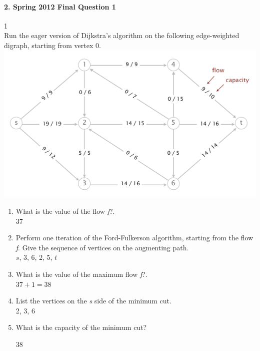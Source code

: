 \documentclass{article}
\begin{document}
\paragraph{\Large 2. Spring 2012 Final Question 1}1\mbox{}\\
Run the eager version of Dijkstra’s algorithm on the following edge-weighted digraph, starting from vertex 0.\\
\includegraphics[]{fin-s12-11.png}
\begin{enumerate}
\renewcommand{\theenumi}{\Alph{enumi}}
	\item What is the value of the flow \textit{f}?.\\
	
	37

	\item Perform one iteration of the Ford-Fulkerson algorithm, starting from the flow \textit{f}. Give the sequence of vertices on the augmenting path.\\

	$s$, 3, 6, 2, 5, $t$  

	\item What is the value of the maximum flow \textit{f}?.\\
	
	$37+1=38$

	\item List the vertices on the \textit{s} side of the minimum cut.\\

	2, 3, 6

	\item What is the capacity of the minimum cut?

	38

\end{enumerate}
\end{document}
